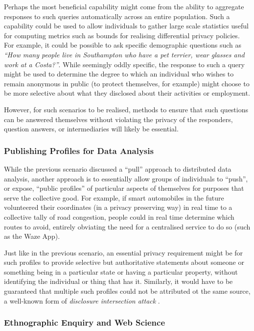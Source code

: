 \documentclass{sig-alternate}
\begin{document}
Perhaps the most beneficial capability might come from the ability to aggregate responses to such queries automatically across an entire population.  Such a capability could be used to allow individuals to gather large scale statistics useful for computing metrics such as bounds for realising differential privacy \cite{dwork2006differential} policies.  For example, it could be possible to ask specific demographic questions such as \emph{``How many people live in Southampton who have a pet terrier, wear glasses and work at a Costa?''}.  While seemingly oddly specific, the response to such a query might be used to determine the degree to which an individual who wishes to remain anonymous in public (to protect themselves, for example) might choose to be more selective about what they disclosed about their activities or employment.

However, for such scenarios to be realised, methods to ensure that such questions can be answered themselves without violating the privacy of the responders, question answers, or intermediaries will likely be essential. 

\subsubsection{Publishing Profiles for Data Analysis}

While the previous scenario discussed a ``pull'' approach to distributed data analysis, another approach is to essentially allow groups of individuals to ``push'', or expose, ``public profiles'' of particular aspects of themselves for purposes that serve the collective good.  For example, if smart automobiles in the future volunteered their coordinates (in a privacy preserving way) in real time to a collective tally of road congestion, people could in real time determine which routes to avoid, entirely obviating the need for a centralised service to do so (such as the Waze App\cite{blatt2013technological}). 

Just like in the previous scenario, an essential privacy requirement might be for such profiles to provide selective but authoritative statements about someone or something being in a particular state or having a particular property, without identifying the individual or thing that has it.  Similarly, it would have to be guaranteed that multiple such profiles could not be attributed ot the same source, a well-known form of \emph{disclosure intersection attack} \cite{danezis2005statistical}.

\subsubsection{Ethnographic Enquiry and Web Science}
\end{document}
